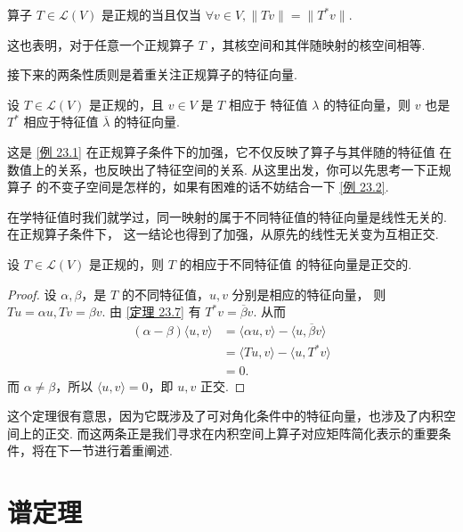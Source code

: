 \begin{theorem}
    算子 $ T \in \mathcal{L}(V) $ 是正规的当且仅当 $ \forall v \in V,
    \lVert Tv \rVert = \lVert T^*v \rVert $. 
\end{theorem}

这也表明，对于任意一个正规算子 $ T $ ，其核空间和其伴随映射的核空间相等. 

接下来的两条性质则是着重关注正规算子的特征向量. 

\begin{theorem}
    设 $ T \in \mathcal{L}(V) $ 是正规的，且 $ v \in V $ 是 $ T $ 相应于
    特征值 $ \lambda $ 的特征向量，则 $ v $ 也是 $ T^* $ 相应于特征值
    $ \overline{\lambda} $ 的特征向量. 
\end{theorem}

这是 \ref{例 23.1} 在正规算子条件下的加强，它不仅反映了算子与其伴随的特征值
在数值上的关系，也反映出了特征空间的关系. 从这里出发，你可以先思考一下正规算子
的不变子空间是怎样的，如果有困难的话不妨结合一下 \ref{例 23.2}.

在学特征值时我们就学过，同一映射的属于不同特征值的特征向量是线性无关的. 在正规算子条件下，
这一结论也得到了加强，从原先的线性无关变为互相正交. 

\begin{theorem}
    设 $ T \in \mathcal{L}(V) $ 是正规的，则 $ T $ 的相应于不同特征值
    的特征向量是正交的. 
\end{theorem}

\begin{proof}
    设 $ \alpha, \beta $，是 $ T $ 的不同特征值，$ u, v $ 分别是相应的特征向量，
    则 $ Tu = \alpha u, Tv = \beta v $. 由 \ref{定理 23.7} 有 $ T^*v = \overline{\beta} v $. 
    从而 
    \begin{align*}
        (\alpha - \beta)\langle u, v \rangle
        & = \langle \alpha u, v \rangle - \langle u, \overline{\beta}v \rangle \\
        & = \langle Tu, v \rangle - \langle u, T^*v \rangle \\
        & = 0. 
    \end{align*}
    而 $ \alpha \neq \beta $，所以 $ \langle u, v \rangle = 0 $，即 $ u, v $ 正交.          
\end{proof}

这个定理很有意思，因为它既涉及了可对角化条件中的特征向量，也涉及了内积空间上的正交. 
而这两条正是我们寻求在内积空间上算子对应矩阵简化表示的重要条件，将在下一节进行着重阐述. 

\section{谱定理}




